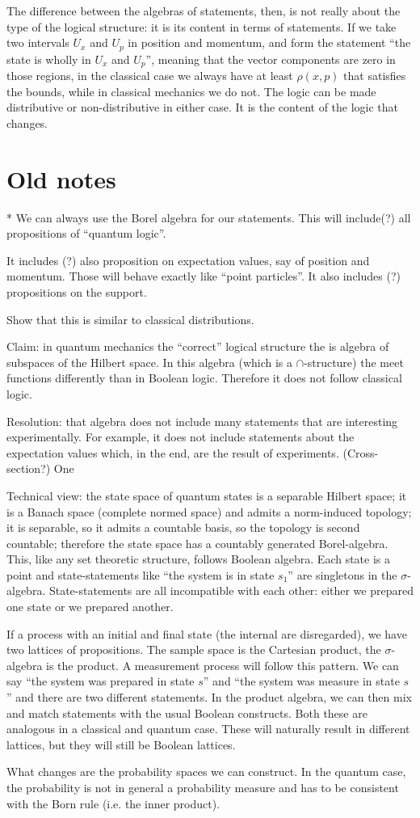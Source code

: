 \documentclass[10pt,twocolumn, nofootinbib]{revtex4-1}
\begin{document}
The difference between the algebras of statements, then, is not really about the type of the logical structure: it is its content in terms of statements. If we take two intervals $U_x$ and $U_p$ in position and momentum, and form the statement ``the state is wholly in $U_x$ and $U_p$'', meaning that the vector components are zero in those regions, in the classical case we always have at least $\rho(x,p)$ that satisfies the bounds, while in classical mechanics we do not. The logic can be made distributive or non-distributive in either case. It is the content of the logic that changes.

\section{Old notes}

* We can always use the Borel algebra for our statements. This will include(?) all propositions of ``quantum logic''.

It includes (?) also proposition on expectation values, say of position and momentum. Those will behave exactly like ``point particles''. It also includes (?) propositions on the support.

Show that this is similar to classical distributions.


Claim: in quantum mechanics the ``correct'' logical structure the is algebra of subspaces of the Hilbert space. In this algebra (which is a $\cap$-structure) the meet functions differently than in Boolean logic. Therefore it does not follow classical logic.

Resolution: that algebra does not include many statements that are interesting experimentally. For example, it does not include statements about the expectation values which, in the end, are the result of experiments. (Cross-section?) One 


Technical view: the state space of quantum states is a separable Hilbert space; it is a Banach space (complete normed space) and admits a norm-induced topology; it is separable, so it admits a countable basis, so the topology is second countable; therefore the state space has a countably generated Borel-algebra. This, like any set theoretic structure, follows Boolean algebra. Each state is a point and state-statements like ``the system is in state $s_1$'' are singletons in the $\sigma$-algebra. State-statements are all incompatible with each other: either we prepared one state or we prepared another.

If a process with an initial and final state (the internal are disregarded), we have two lattices of propositions. The sample space is the Cartesian product, the $\sigma$-algebra is the product. A measurement process will follow this pattern. We can say ``the system was prepared in state $s$'' and ``the system was measure in state $s$'' and there are two different statements. In the product algebra, we can then mix and match statements with the usual Boolean constructs. Both these are analogous in a classical and quantum case. These will naturally result in different lattices, but they will still be Boolean lattices.

What changes are the probability spaces we can construct. In the quantum case, the probability is not in general a probability measure and has to be consistent with the Born rule (i.e. the inner product).



\end{document}
